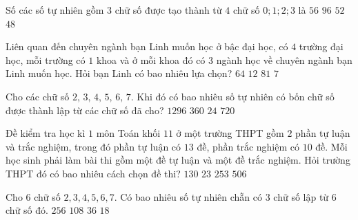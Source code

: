 \begin{ex}%
	Số các số tự nhiên gồm $3$ chữ số được tạo thành từ $4$ chữ số $0;1;2;3$ là
	\choice
	{$56$}
	{$96$}
	{$52$}
	{\True $48$}
\end{ex}

\begin{ex}%
	Liên quan đến chuyên ngành bạn Linh muốn học ở bậc đại học, có $4$ trường đại học, mỗi trường có $1$ khoa và ở mỗi khoa đó có $3$ ngành học về chuyên ngành bạn Linh muốn học. Hỏi bạn
	Linh có bao nhiêu lựa chọn?
	\choice
	{$64$}
	{\True $12$}
	{$81$}
	{$7$}
\end{ex}

\begin{ex}%
	Cho các chữ số $2,\,3,\,4,\,5,\,6,\,7.$ Khi đó có bao nhiêu số tự nhiên có bốn chữ số được thành lập từ các chữ số đã cho?
	\choice
	{$1296$}
	{\True $360$}
	{$24$}
	{$720$}
\end{ex}

\begin{ex}%
	Đề kiểm tra học kì $1$ môn Toán khối $11$ ở một trường THPT gồm $2$ phần tự luận và trắc nghiệm, trong đó phần tự luận có $13$ đề, phần trắc nghiệm có $10$ đề. Mỗi học sinh phải làm bài thi gồm một đề tự luận và một đề trắc nghiệm. Hỏi trường THPT đó có bao nhiêu cách chọn đề thi?
	\choice
	{\True $130$}
	{ $23$}
	{$253$}
	{$506$}
\end{ex}

\begin{ex}%
	Cho $6$ chữ số $2, 3, 4, 5, 6, 7.$ Có bao nhiêu số tự nhiên chẵn có $3$ chữ số lập từ $6$ chữ số đó.
	\choice
	{$256$}
	{\True $108$}
	{$36$}
	{$18$}
\end{ex}

